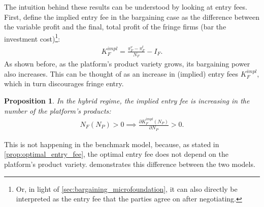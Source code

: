 \documentclass[a4paper]{article}
\newtheorem{proposition}{Proposition}
\begin{document}
The intuition behind these results can be understood by looking at entry fees.
First, define the implied entry fee in the bargaining case as the difference between the variable profit and the final, total profit of the fringe firms (bar the investment cost)\footnote{
    Or, in light of \cref{sec:bargaining_microfoundation}, it can also directly be interpreted as the entry fee that the parties agree on after negotiating.
}:
\begin{align*}
    K_F^{impl} = \frac{\pi_F^v - \pi_F^t}{N_F} - I_F.
\end{align*}
As shown before, as the platform's product variety grows, its bargaining power also increases.
This can be thought of as an increase in (implied) entry fees $K_F^{impl}$, which in turn discourages fringe entry.
\begin{proposition}
    \label{prop:implied_entry_fee_comparative}
    In the hybrid regime, the implied entry fee is increasing in the number of the platform's products:
    \begin{align*}
        N_F(N_P) > 0 \implies \frac{\partial K_F^{impl}(N_P)}{\partial N_P} > 0.
    \end{align*}
\end{proposition}
This is not happening in the benchmark model, because, as stated in \cref{prop:optimal_entry_fee}, the optimal entry fee does not depend on the platform's product variety.
 demonstrates this difference between the two models.
\end{document}
